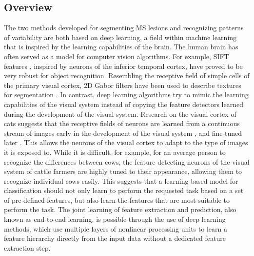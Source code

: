 \subsection{Overview}

The two methods developed for segmenting MS lesions and recognizing patterns of
variability are both based on deep learning, a field within machine learning
that is inspired by the learning capabilities of the brain. The human brain has
often served as a model for computer vision algorithms.
For example, SIFT features \citep{lowe1999}, inspired by neurons of the inferior
temporal cortex, have proved to be very robust for object recognition.
Resembling the receptive field of simple cells of the primary visual cortex, 2D
Gabor filters have been used to describe textures for segmentation
\citep{grigorescu2002}. In contrast, deep learning algorithms try to mimic the
learning capabilities of the visual system instead of copying the feature
detectors learned during the development of the visual system. Research on the
visual cortex of cats suggests that the receptive fields of neurons are learned
from a continuous stream of images early in the development of the visual system
\citep{wiesel1963}, and fine-tuned later \citep{karni1991}.
This allows the neurons of the visual cortex to adapt to the type of images it
is exposed to. While it is difficult, for example, for an average person to
recognize the differences between cows, the feature detecting neurons of the
visual system of cattle farmers are highly tuned to their appearance, allowing
them to recognize individual cows easily. This suggests that a learning-based
model for classification should not only learn to perform the requested task
based on a set of pre-defined features, but also learn the features that are
most suitable to perform the task. The joint learning of feature extraction and
prediction, also known as end-to-end learning, is possible through the use of
deep learning methods, which use multiple layers of nonlinear processing units
to learn a feature hierarchy directly from the input data without a dedicated
feature extraction step.

